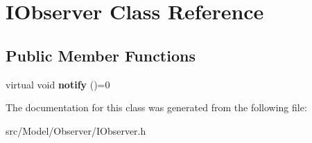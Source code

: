 \hypertarget{classIObserver}{}\section{I\+Observer Class Reference}
\label{classIObserver}
\subsection*{Public Member Functions}
\begin{DoxyCompactItemize}
\item 
virtual void {\bfseries notify} ()=0\hypertarget{classIObserver_a839e55b72ed89f400b70caf92e57a433}{}\label{classIObserver_a839e55b72ed89f400b70caf92e57a433}

\end{DoxyCompactItemize}


The documentation for this class was generated from the following file\+:\begin{DoxyCompactItemize}
\item 
src/\+Model/\+Observer/I\+Observer.\+h\end{DoxyCompactItemize}
